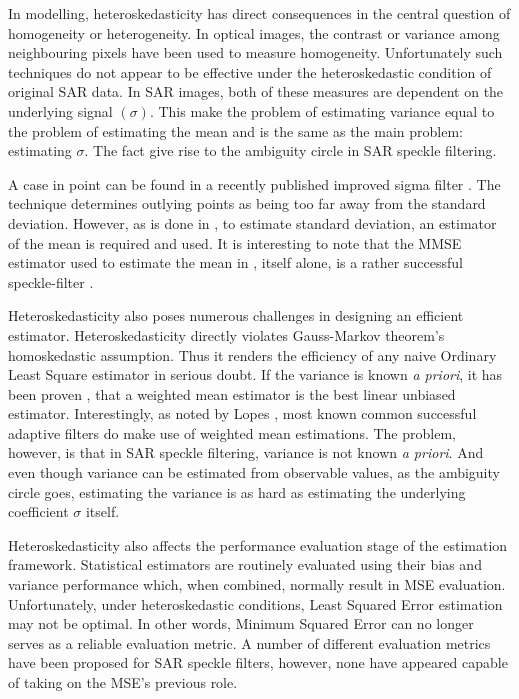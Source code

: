 In modelling, heteroskedasticity has direct consequences in the central question of homogeneity or heterogeneity. 
In optical images, the contrast or variance among neighbouring pixels have been used to measure homogeneity. 
Unfortunately such techniques do not appear to be effective under the heteroskedastic condition of original SAR data. 
In SAR images, both of these measures are dependent on the underlying signal $(\sigma)$. 
This make the problem of estimating variance equal to the problem of estimating the mean and is the same as the main problem: estimating $\sigma$. 
The fact give rise to the ambiguity circle in SAR speckle filtering.

A case in point can be found in a recently published improved sigma filter \cite{Lee_TGRS_2009}. 
The technique determines outlying points as being too far away from the standard deviation. 
However, as is done in \cite{Lee_TGRS_2009}, to estimate standard deviation, an estimator of the mean is required and used. 
It is interesting to note that the MMSE estimator used to estimate the mean in \cite{Lee_TGRS_2009}, itself alone, is a rather successful speckle-filter \cite{Lee_PAMI_1980}.

Heteroskedasticity also poses numerous challenges in designing an efficient estimator. Heteroskedasticity directly violates Gauss-Markov theorem's homoskedastic assumption. 
Thus it renders the efficiency of any naive Ordinary Least Square estimator in serious doubt. 
If the variance is known \textit{a priori}, it has been proven \cite{Aitken_1934_ProcsRoyalSocEdinburg}, that a weighted mean estimator is the best linear unbiased estimator. 
Interestingly, as noted by Lopes \cite{Lopes_TGRS_1990}, most known common successful adaptive filters \cite{Lee_PAMI_1980, Kuan_1985_PAMI, Frost_PAMI_1982} do make use of weighted mean estimations. 
The problem, however, is that in SAR speckle filtering, variance is not known \textit{a priori}. 
And even though variance can be estimated from observable values, as the ambiguity circle goes, estimating the variance is as hard as estimating the underlying coefficient $\sigma$ itself.

Heteroskedasticity also affects the performance evaluation stage of the estimation framework.
Statistical estimators are routinely evaluated using their bias and variance performance
  which, when combined, normally result in MSE evaluation.
Unfortunately, under heteroskedastic conditions, Least Squared Error estimation may not be optimal.   
In other words, Minimum Squared Error can no longer serves as a reliable evaluation metric.
A number of different evaluation metrics have been proposed for SAR speckle filters,
  however, none have appeared capable of taking on the MSE's previous role.

